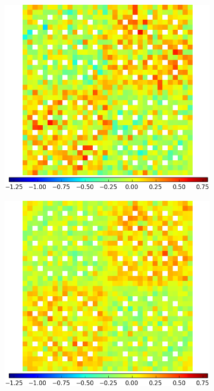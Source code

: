 \begin{figure}[h!]
\begin{subfigure}{0.45\textwidth}
  \includegraphics[width=\linewidth]{figures/results/2x2/ensemble-transform/capt-err-degenerate}
  \caption{}
  \label{fig:chap11-assm-2x2-capt-degenerate}
\end{subfigure}
\begin{subfigure}{0.45\textwidth}
  \centering
  \includegraphics[width=\linewidth]{figures/results/2x2/ensemble-transform/capt-err-lns}

\end{subfigure}
\end{figure}
